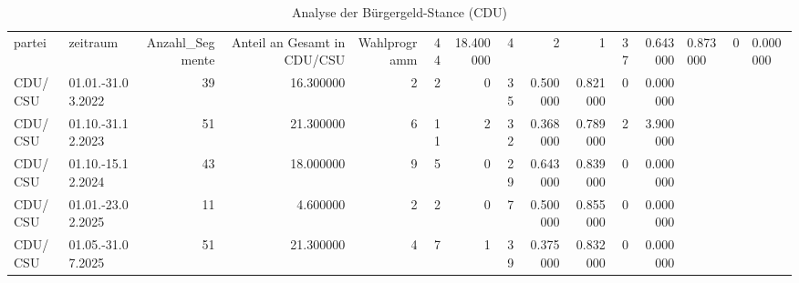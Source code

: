 \begin{table}
\caption{Analyse der Bürgergeld-Stance (CDU)}
\label{tab:meine_tabelle}
\begin{tabular}{llrrrrrrrrrr}
\toprule
partei & zeitraum & Anzahl_Segmente & Anteil an Gesamt in %
\midrule
CDU/CSU & Wahlprogramm & 44 & 18.400000 & 4 & 2 & 1 & 37 & 0.643000 & 0.873000 & 0 & 0.000000 \\
CDU/CSU & 01.01.-31.03.2022 & 39 & 16.300000 & 2 & 2 & 0 & 35 & 0.500000 & 0.821000 & 0 & 0.000000 \\
CDU/CSU & 01.10.-31.12.2023 & 51 & 21.300000 & 6 & 11 & 2 & 32 & 0.368000 & 0.789000 & 2 & 3.900000 \\
CDU/CSU & 01.10.-15.12.2024 & 43 & 18.000000 & 9 & 5 & 0 & 29 & 0.643000 & 0.839000 & 0 & 0.000000 \\
CDU/CSU & 01.01.-23.02.2025 & 11 & 4.600000 & 2 & 2 & 0 & 7 & 0.500000 & 0.855000 & 0 & 0.000000 \\
CDU/CSU & 01.05.-31.07.2025 & 51 & 21.300000 & 4 & 7 & 1 & 39 & 0.375000 & 0.832000 & 0 & 0.000000 \\
\bottomrule
\end{tabular}
\end{table}
